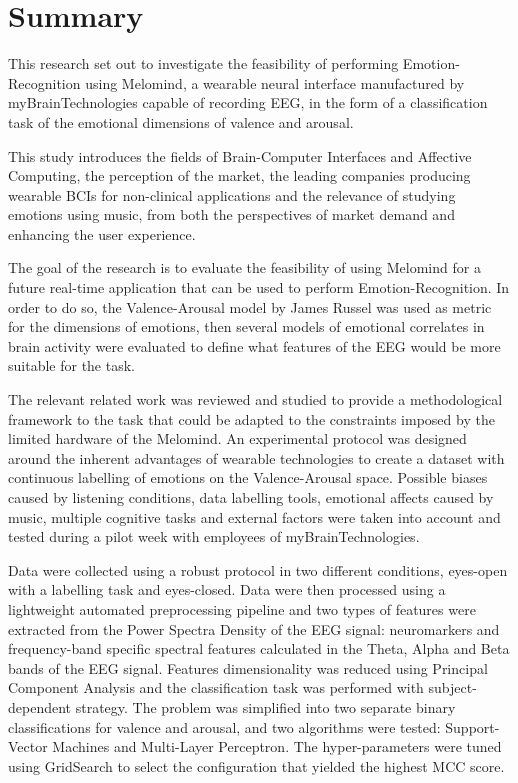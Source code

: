 \chapter{Summary}
\pagestyle{headings}

This research set out to investigate the feasibility of performing Emotion-Recognition using Melomind, a wearable neural interface manufactured by myBrainTechnologies capable of recording \ac{EEG}, in the form of a classification task of the emotional dimensions of valence and arousal.

This study introduces the fields of Brain-Computer Interfaces and Affective Computing, the perception of the market, the leading companies producing wearable BCIs for non-clinical applications and the relevance of studying emotions using music, from both the perspectives of market demand and enhancing the user experience.

The goal of the research is to evaluate the feasibility of using Melomind for a future real-time application that can be used to perform Emotion-Recognition. In order to do so, the Valence-Arousal model by James Russel was used as metric for the dimensions of emotions, then several models of emotional correlates in brain activity were evaluated to define what features of the EEG would be more suitable for the task.

The relevant related work was reviewed and studied to provide a methodological framework to the task that could be adapted to the constraints imposed by the limited hardware of the Melomind. An experimental protocol was designed around the inherent advantages of wearable technologies to create a dataset with continuous labelling of emotions on the Valence-Arousal space. Possible biases caused by listening conditions, data labelling tools, emotional affects caused by music, multiple cognitive tasks and external factors were taken into account and tested during a pilot week with employees of myBrainTechnologies.

Data were collected using a robust protocol in two different conditions, eyes-open with a labelling task and eyes-closed. Data were then processed using a lightweight automated preprocessing pipeline and two types of features were extracted from the Power Spectra Density of the EEG signal: neuromarkers and frequency-band specific spectral features calculated in the Theta, Alpha and Beta bands of the EEG signal. Features dimensionality was reduced using Principal Component Analysis and the classification task was performed with subject-dependent strategy. The problem was simplified into two separate binary classifications for valence and arousal, and two algorithms were tested: Support-Vector Machines and Multi-Layer Perceptron. The hyper-parameters were tuned using GridSearch to select the configuration that yielded the highest MCC score. 

